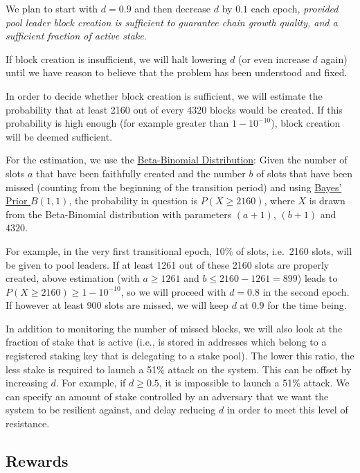 \documentclass[11pt,a4paper]{article}
\begin{document}
We plan to start with \(d=0.9\) and then decrease \(d\) by \(0.1\) each
epoch, \emph{provided pool leader block creation is sufficient to
guarantee chain growth quality, and a sufficient fraction of active
stake}.

If block creation is insufficient, we will halt lowering \(d\) (or even
increase \(d\) again) until we have reason to believe that the problem
has been understood and fixed.

In order to decide whether block creation is sufficient, we will
estimate the probability that at least 2160 out of every 4320 blocks
would be created. If this probability is high enough (for example
greater than \(1 - 10^{-10}\)), block creation will be deemed
sufficient.

For the estimation, we use the
\href{https://en.wikipedia.org/wiki/Beta-binomial_distribution}{Beta-Binomial
Distribution}: Given the number of slots \(a\) that have been faithfully
created and the number \(b\) of slots that have been missed (counting
from the beginning of the transition period) and using
\href{https://en.wikipedia.org/wiki/Beta_distribution\#Bayes'_prior_probability_(Beta(1,1))}{Bayes'
Prior \(B(1,1)\)}, the probability in question is \(P(X\geq 2160)\),
where \(X\) is drawn from the Beta-Binomial distribution with parameters
\((a + 1)\), \((b + 1)\) and \(4320\).

For example, in the very first transitional epoch, 10\% of slots,
i.e.~2160 slots, will be given to pool leaders. If at least 1261 out of
these 2160 slots are properly created, above estimation (with
\(a\geq 1261\) and \(b\leq 2160-1261=899\)) leads to
\(P(X\geq 2160)\geq 1-10^{-10}\), so we will proceed with \(d=0.8\) in
the second epoch. If however at least 900 slots are missed, we will keep
\(d\) at \(0.9\) for the time being.

In addition to monitoring the number of missed blocks, we will also look
at the fraction of stake that is active (i.e., is stored in addresses
which belong to a registered staking key that is delegating to a stake
pool). The lower this ratio, the less stake is required to launch a 51\%
attack on the system. This can be offset by increasing \(d\). For
example, if \(d \geq 0.5\), it is impossible to launch a 51\% attack. We
can specify an amount of stake controlled by an adversary that we want
the system to be resilient against, and delay reducing \(d\) in order to
meet this level of resistance.

\subsection{Rewards}
\label{rewards}
\end{document}
